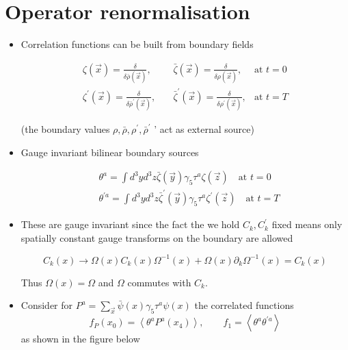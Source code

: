 \section{Operator renormalisation}

\begin{itemize}
  \item Correlation functions can be built from boundary fields

\begin{equation}
\begin{array}{lll}
\zeta(\vec{x})=\frac{\delta}{\delta \bar{\rho}{(\vec x)}},\quad & \bar{\zeta}(\vec{x})=\frac{\delta}{\delta \rho(\vec{x})}, & \text{at } t=0\\
\zeta^{\prime}(\vec{x})=\frac{\delta}{\delta \bar{\rho}^{\prime}(\vec{x})},\quad & \bar{\zeta}^{\prime}(\vec{x})=\frac{\delta}{\delta \rho^{\prime}(\vec{x})},  & \text{at } t=T
\end{array}     
\end{equation}


(the boundary values \(\rho, \bar{\rho}, \rho^{\prime}, \bar{\rho}^\prime\) ' act as external source)

  \item Gauge invariant bilinear boundary sources

\begin{equation}
\begin{aligned}
& \theta^{a}=\int d^{3} y d^{3} z \bar{\zeta}(\vec{y}) \gamma_{5} \tau^{a} \zeta(\vec{z}) \quad \text{at } t=0 \\
& \theta^{\prime a}=\int d^{3} y d^{3} z \bar{\zeta}^{\prime}(\vec{y}) \gamma_{5} \tau^{a} \zeta^{\prime}(\vec{z}) \quad \text{at } t=T
\end{aligned}
\end{equation}


  \item These are gauge invariant since the fact the we hold \(C_{k}, C_{k}^{\prime}\) fixed means only spatially constant gauge transforms on the boundary are allowed

\begin{equation}
C_{k}(x) \rightarrow \Omega(x) C_{k}(x) \Omega^{-1}(x)+\Omega(x) \partial_{k} \Omega^{-1}(x)=C_{k}(x)
\end{equation}

Thus \(\Omega(x)=\Omega\) and \(\Omega\) commutes with \(C_{k}\).

  \item Consider for \(P^{a}=\sum_{\vec{x}} \bar{\psi}(x) \gamma_{5} \tau^{a} \psi(x)\)
the correlated functions
\begin{equation}
    f_{P}\left(x_{0}\right)=\left\langle\theta^{a} P^{a}\left(x_{4}\right)\right\rangle, \qquad f_{1}=\left\langle\theta^{a} \theta^{\prime a}\right\rangle
\end{equation}
as shown in the figure below


\end{itemize}
